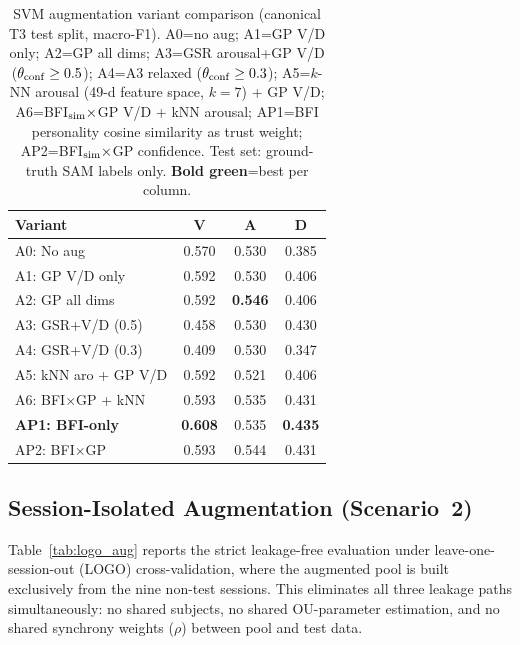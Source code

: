 \documentclass[sigconf,review,anonymous]{acmart}
\newcommand{\best}[1]{\textbf{\textcolor{bestcol}{#1}}}
\begin{document}
\begin{table}[t]
\caption{SVM augmentation variant comparison (canonical T3 test split,
  macro-F1). A0=no aug; A1=GP V/D only; A2=GP all dims;
  A3=GSR arousal+GP V/D ($\theta_{\rm conf}\geq 0.5$);
  A4=A3 relaxed ($\theta_{\rm conf}\geq 0.3$);
  A5=$k$-NN arousal (49-d feature space, $k{=}7$) + GP V/D;
  A6=BFI$_{\rm sim}\times$GP V/D + kNN arousal;
  AP1=BFI personality cosine similarity as trust weight;
  AP2=BFI$_{\rm sim}\times$GP confidence.
  Test set: ground-truth SAM labels only.
  \best{Bold green}=best per column.}
\label{tab:svm_aug}
\centering
\setlength{\tabcolsep}{4pt}
\small
\begin{tabular}{lccc}
\toprule
\textbf{Variant} & \textbf{V} & \textbf{A} & \textbf{D} \\
\midrule
A0: No aug          & 0.570 & 0.530 & 0.385 \\
A1: GP V/D only     & 0.592 & 0.530 & 0.406 \\
A2: GP all dims     & 0.592 & \best{0.546} & 0.406 \\
A3: GSR+V/D (0.5)   & 0.458 & 0.530 & 0.430 \\
A4: GSR+V/D (0.3)   & 0.409 & 0.530 & 0.347 \\
A5: kNN aro + GP V/D & 0.592 & 0.521 & 0.406 \\
A6: BFI$\times$GP + kNN & 0.593 & 0.535 & 0.431 \\
\midrule
\best{AP1: BFI-only}  & \best{0.608} & 0.535 & \best{0.435} \\
AP2: BFI$\times$GP  & 0.593 & 0.544 & 0.431 \\
\bottomrule
\end{tabular}
\end{table}

\subsection{Session-Isolated Augmentation (Scenario~2)}
\label{sec:logo_aug}

Table~\ref{tab:logo_aug} reports the strict leakage-free evaluation under
leave-one-session-out (LOGO) cross-validation, where the augmented pool
is built exclusively from the nine non-test sessions.
This eliminates all three leakage paths simultaneously: no shared subjects,
no shared OU-parameter estimation, and no shared synchrony weights ($\rho$)
between pool and test data.
\end{document}
